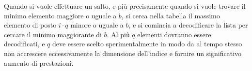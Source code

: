 \documentclass[\main/main.tex]{subfiles}
\begin{document}
\begin{multicols}{2}
\begin{definition}
    Quando si vuole effettuare un salto, e più precisamente quando si vuole trovare il minimo elemento maggiore o uguale a \(b\), si cerca nella tabella il massimo elemento di posto \(i\cdot q\) minore o uguale a \(b\), e si comincia a decodificare la lista per cercare il minimo maggiorante di \(b\). Al più \(q\) elementi dovranno essere decodificati, e \(q\) deve essere scelto sperimentalmente in modo da al tempo stesso non accrescere eccessivamente la dimensione dell'indice e fornire un significativo aumento di prestazioni.
\end{definition}
\end{multicols}
\end{document}
